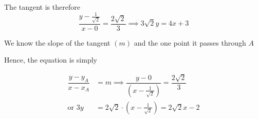 \documentclass[14pt,fleqn]{extarticle}
\begin{document}
The tangent is therefore 
\[ \frac{y-\frac{1}{\sqrt{2}}}{x-0} = \frac{2\sqrt{2}}{3}\implies 3\sqrt{2} y = 4x + 3 \]

%

\newcard

We know the slope of the tangent $(m)$
and the one point it passes through $A$\newline

Hence, the equation is simply 

\begin{align}
\dfrac{y - y_A}{x - x_A} &= m \implies \dfrac{y - 0}{\left( x-\frac{1}{\sqrt{2}}\right)} = \dfrac{2\sqrt{2}}{3} \\
\text{or } 3y &= 2\sqrt{2}\cdot\left( x - \frac{1}{\sqrt{2}}\right) = 2\sqrt{2}x - 2 
\end{align}
\end{document}
